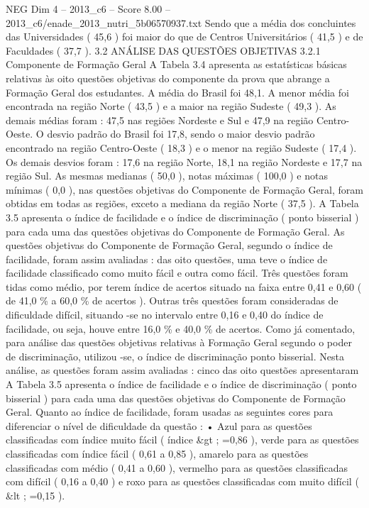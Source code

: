 \begin{textsample}{NEG Dim 4 – 2013\_c6 – Score 8.00 – 2013\_c6/enade\_2013\_nutri\_5b06570937.txt}
Sendo que a média dos concluintes das Universidades ( 45,6 ) foi maior do que de Centros Universitários ( 41,5 ) e de Faculdades ( 37,7 ). 3.2 ANÁLISE DAS QUESTÕES OBJETIVAS 3.2.1 Componente de Formação Geral A Tabela 3.4 apresenta as estatísticas básicas relativas às oito questões objetivas do componente da prova que abrange a Formação Geral dos estudantes.
A média do Brasil foi 48,1.
A menor média foi encontrada na região Norte ( 43,5 ) e a maior na região Sudeste ( 49,3 ).
As demais médias foram : 47,5 nas regiões Nordeste e Sul e 47,9 na região Centro-Oeste.
O desvio padrão do Brasil foi 17,8, sendo o maior desvio padrão encontrado na região Centro-Oeste ( 18,3 ) e o menor na região Sudeste ( 17,4 ).
Os demais desvios foram : 17,6 na região Norte, 18,1 na região Nordeste e 17,7 na região Sul.
As mesmas medianas ( 50,0 ), notas máximas ( 100,0 ) e notas mínimas ( 0,0 ), nas questões objetivas do Componente de Formação Geral, foram obtidas em todas as regiões, exceto a mediana da região Norte ( 37,5 ).
A Tabela 3.5 apresenta o índice de facilidade e o índice de discriminação ( ponto bisserial ) para cada uma das questões objetivas do Componente de Formação Geral.
As questões objetivas do Componente de Formação Geral, segundo o índice de facilidade, foram assim avaliadas : das oito questões, uma teve o índice de facilidade classificado como muito fácil e outra como fácil.
Três questões foram tidas como médio, por terem índice de acertos situado na faixa entre 0,41 e 0,60 ( de 41,0 \% a 60,0 \% de acertos ).
Outras três questões foram consideradas de dificuldade difícil, situando -se no intervalo entre 0,16 e 0,40 do índice de facilidade, ou seja, houve entre 16,0 \% e 40,0 \% de acertos.
Como já comentado, para análise das questões objetivas relativas à Formação Geral segundo o poder de discriminação, utilizou -se, o índice de discriminação ponto bisserial.
Nesta análise, as questões foram assim avaliadas : cinco das oito questões apresentaram A Tabela 3.5 apresenta o índice de facilidade e o índice de discriminação ( ponto bisserial ) para cada uma das questões objetivas do Componente de Formação Geral.
Quanto ao índice de facilidade, foram usadas as seguintes cores para diferenciar o nível de dificuldade da questão : • Azul para as questões classificadas com índice muito fácil ( índice \&gt ; =0,86 ), verde para as questões classificadas com índice fácil ( 0,61 a 0,85 ), amarelo para as questões classificadas com médio ( 0,41 a 0,60 ), vermelho para as questões classificadas com difícil ( 0,16 a 0,40 ) e roxo para as questões classificadas com muito difícil ( \&lt ; =0,15 ).

\end{textsample}

